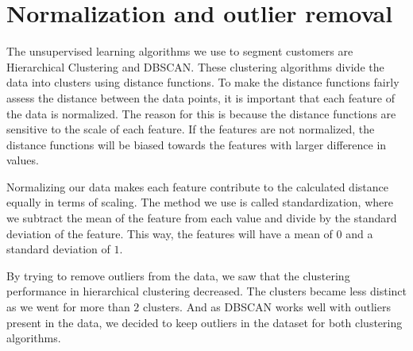 \section{Normalization and outlier removal}

The unsupervised learning algorithms we use to segment customers are Hierarchical Clustering and \linebreak DBSCAN. These clustering algorithms divide the data into clusters using distance functions. To make the distance functions fairly assess the distance between the data points, it is important that each feature of the data is normalized. The reason for this is because the distance functions are sensitive to the scale of each feature. If the features are not normalized, the distance functions will be biased towards the features with larger difference in values. 
\par 
Normalizing our data makes each feature contribute to the calculated distance equally in terms of scaling. The method we use is called standardization, where we subtract the mean of the feature from each value and divide by the standard deviation of the feature. This way, the features will have a mean of $0$ and a standard deviation of $1$.
\par
By trying to remove outliers from the data, we saw that the clustering performance in hierarchical clustering decreased. The clusters became less distinct as we went for more than $2$ clusters. And as DBSCAN works well with outliers present in the data, we decided to keep outliers in the dataset for both clustering algorithms.